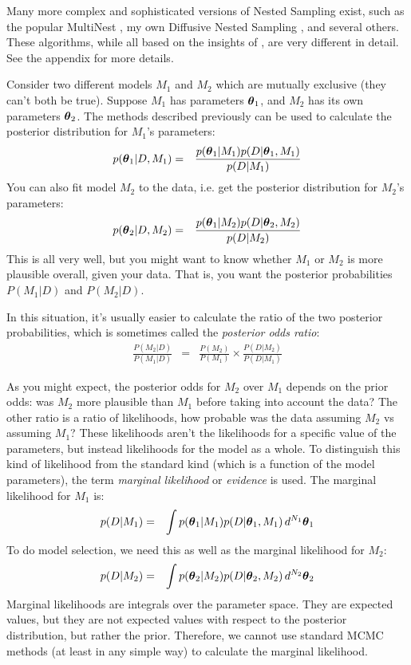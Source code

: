 Many more complex and sophisticated versions of
Nested Sampling exist, such as the popular MultiNest \citep{multinest},
my own Diffusive Nested Sampling \citep{dnest}, and several others. These
algorithms, while all based on the insights of \citet{skilling}, are very
different in detail. See the appendix for more details.

Consider two different models $M_1$ and $M_2$ which are mutually exclusive
(they can't both be true).
Suppose $M_1$ has parameters
$\boldsymbol{\theta}_1$, and $M_2$ has its own parameters $\boldsymbol{\theta}_2$. The methods
described previously can be used to calculate the posterior distribution for
$M_1$'s parameters:
\begin{eqnarray}
p(\boldsymbol{\theta}_1 | D, M_1) &=& \frac{p(\boldsymbol{\theta}_1 | M_1)p(D | \boldsymbol{\theta}_1, M_1)}
{p(D | M_1)}
\end{eqnarray}
You can also fit model $M_2$ to the data, i.e. get the posterior distribution
for $M_2$'s parameters:
\begin{eqnarray}
p(\boldsymbol{\theta}_2 | D, M_2) &=& \frac{p(\boldsymbol{\theta}_1 | M_2)p(D | \boldsymbol{\theta}_2, M_2)}
{p(D | M_2)}
\end{eqnarray}
This is all very well, but you might want to know whether $M_1$ or $M_2$ is
more plausible overall, given your data. That is, you want the posterior
probabilities $P(M_1 | D)$ and $P(M_2 | D)$.

In this situation, it's usually easier to calculate the ratio of the two
posterior probabilities, which is sometimes called the {\it posterior odds
ratio}:
\begin{eqnarray}
\frac{P(M_2 | D)}{P(M_1 | D)} &=& \frac{P(M_2)}{P(M_1)}
\times \frac{P(D | M_2)}{P(D | M_1)}
\end{eqnarray}

As you might expect, the posterior odds for $M_2$ over $M_1$ depends on the
prior odds: was $M_2$ more plausible than $M_1$ before taking into account the
data? The other ratio is a ratio of likelihoods, how probable was the data
assuming $M_2$ vs assuming $M_1$? These likelihoods aren't the likelihoods
for a specific value of the parameters, but instead likelihoods for the model
as a whole. To distinguish this kind of likelihood from the standard kind (which
is a function of the model parameters), the term {\it marginal likelihood} or
{\it evidence} is used. The marginal likelihood for $M_1$ is:
\begin{eqnarray}
p(D | M_1) &=& \int p(\boldsymbol{\theta}_1 | M_1) p(D | \boldsymbol{\theta}_1, M_1) \, d^{N_1} \boldsymbol{\theta}_1
\label{eq:marginal_likelihood}
\end{eqnarray}
To do model selection, we need this as well as the marginal likelihood for
$M_2$:
\begin{eqnarray}
p(D | M_2) &=& \int p(\boldsymbol{\theta}_2 | M_2) p(D | \boldsymbol{\theta}_2, M_2) \, d^{N_2} \boldsymbol{\theta}_2
\end{eqnarray}
Marginal likelihoods are integrals over the parameter space. They are
expected values, but they are not expected values with respect to the posterior
distribution, but rather the prior. Therefore, we cannot use standard MCMC
methods (at least in any simple way) to calculate the marginal likelihood.

